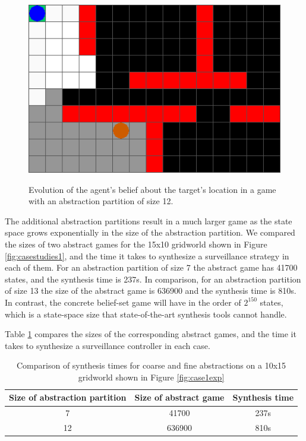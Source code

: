 \begin{figure}
\begin{minipage}{1\columnwidth}
{			\includegraphics[width=0.32\columnwidth]{Surveillance/figs/Liveness_fine_t4.png}
		}
		
	\end{minipage}
	
	
	\caption{Evolution of the agent's belief about the target's location in a game  with an abstraction partition of size 12.
	}
	\label{fig:case1fineexp}
	
\end{figure}


The additional abstraction partitions result in a much larger game as the state space grows exponentially in the size of the abstraction partition. We compared the sizes of two abstract games for the 15x10 gridworld shown in Figure \ref{fig:casestudies1}, and the time it takes to synthesize a surveillance strategy in each of them. For an abstraction partition of size 7 the abstract game has 41700 states, and the synthesis time is 237s. In comparison, for an abstraction partition of size 13 the size of the abstract game is 636900 and the synthesis time is 810s. In contrast, the concrete belief-set game will have in the order of $2^{150}$ states, which is a state-space size that state-of-the-art synthesis tools cannot handle. 

Table \ref{tab:exp1} compares the sizes of the corresponding abstract games, and the time it takes to synthesize a surveillance controller in each case.


\begin{table}[h!]
	\centering
	\begin{tabular}{c|c|c}
	Size of abstraction partition & Size of abstract game & Synthesis time \\ \hline \hline
		7 & 41700 & 237s \\ 
		12 & 636900 & 810s \\ 
	\end{tabular}\caption{Comparison of synthesis times for coarse and fine abstractions on a 10x15 gridworld shown in Figure \ref{fig:case1exp}} \label{tab:exp1}
\end{table}




